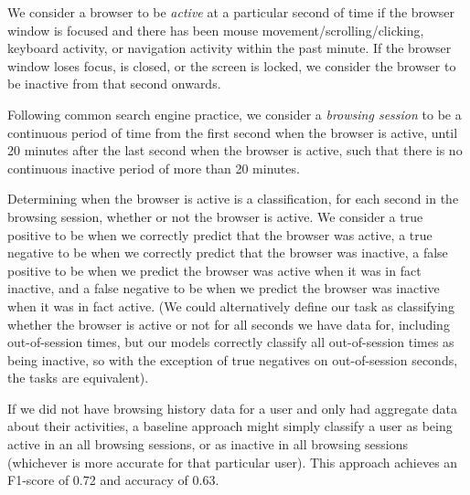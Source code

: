 \documentclass{sigchi}
\begin{document}
We consider a browser to be \textit{active} at a particular second of time if the browser window is focused and there has been mouse movement/scrolling/clicking, keyboard activity, or navigation activity within the past minute. If the browser window loses focus, is closed, or the screen is locked, we consider the browser to be inactive from that second onwards.

Following common search engine practice, we consider a \textit{browsing session} to be a continuous period of time from the first second when the browser is active, until 20 minutes after the last second when the browser is active, such that there is no continuous inactive period of more than 20 minutes.

Determining when the browser is active is a classification, for each second in the browsing session, whether or not the browser is active. We consider a true positive to be when we correctly predict that the browser was active, a true negative to be when we correctly predict that the browser was inactive, a false positive to be when we predict the browser was active when it was in fact inactive, and a false negative to be when we predict the browser was inactive when it was in fact active. (We could alternatively define our task as classifying whether the browser is active or not for all seconds we have data for, including out-of-session times, but our models correctly classify all out-of-session times as being inactive, so with the exception of true negatives on out-of-session seconds, the tasks are equivalent).


If we did not have browsing history data for a user and only had aggregate data about their activities, a baseline approach might simply classify a user as being active in an all browsing sessions, or as inactive in all browsing sessions (whichever is more accurate for that particular user). This approach achieves an F1-score of 0.72 and accuracy of 0.63.

\end{document}
